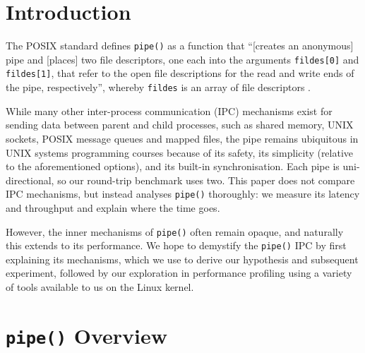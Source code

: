 \documentclass[11pt,sigconf,nonacm]{acmart}
\begin{document}
\section{Introduction}

The POSIX standard defines \texttt{pipe()} as a function that ``[creates an anonymous] pipe and [places] two file descriptors, one each into the arguments \texttt{fildes[0]} and \texttt{fildes[1]}, that refer to the open file descriptions for the read and write ends of the pipe, respectively'', whereby \texttt{fildes} is an array of file descriptors \cite{posix2024}.

While many other inter-process communication (IPC) mechanisms exist for sending data between parent and child processes, such as shared memory, UNIX sockets, POSIX message queues and mapped files, the pipe remains ubiquitous in UNIX systems programming courses because of its safety, its simplicity (relative to the aforementioned options), and its built-in synchronisation. Each pipe is uni-directional, so our round-trip benchmark uses two. This paper does not compare IPC mechanisms, but instead analyses \texttt{pipe()} thoroughly: we measure its latency and throughput and explain where the time goes.

However, the inner mechanisms of \texttt{pipe()} often remain opaque, and naturally this extends to its performance. We hope to demystify the \texttt{pipe()} IPC by first explaining its mechanisms, which we use to derive our hypothesis and subsequent experiment, followed by our exploration in performance profiling using a variety of tools available to us on the Linux kernel.

\section{\texttt{pipe()} Overview}
\end{document}
